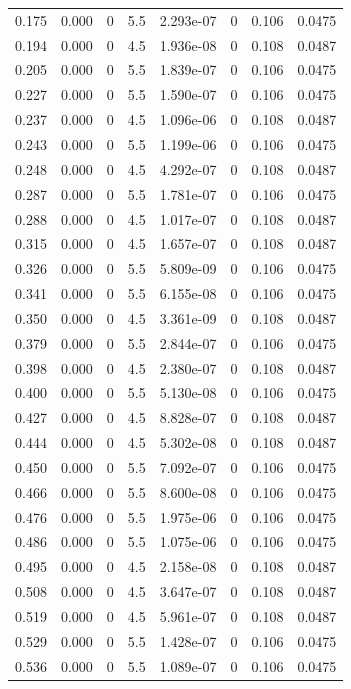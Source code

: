 \documentclass[preview]{standalone}
\begin{document}
{{\begin{tabular}{L{1.2cm}C{1.2cm} C{0.3cm}C{0.5cm} C{1.4cm}C{1.4cm} C{1.4cm}C{1.4cm}}
  0.175  &  0.000  & 0     & 5.5 &  2.293e-07  & 0  & 0.106 &  0.0475   \\ 
  0.194  &  0.000  & 0     & 4.5 &  1.936e-08  & 0  & 0.108 &  0.0487   \\ 
  0.205  &  0.000  & 0     & 5.5 &  1.839e-07  & 0  & 0.106 &  0.0475   \\ 
  0.227  &  0.000  & 0     & 5.5 &  1.590e-07  & 0  & 0.106 &  0.0475   \\ 
  0.237  &  0.000  & 0     & 4.5 &  1.096e-06  & 0  & 0.108 &  0.0487   \\ 
  0.243  &  0.000  & 0     & 5.5 &  1.199e-06  & 0  & 0.106 &  0.0475   \\ 
  0.248  &  0.000  & 0     & 4.5 &  4.292e-07  & 0  & 0.108 &  0.0487   \\ 
  0.287  &  0.000  & 0     & 5.5 &  1.781e-07  & 0  & 0.106 &  0.0475   \\ 
  0.288  &  0.000  & 0     & 4.5 &  1.017e-07  & 0  & 0.108 &  0.0487   \\ 
  0.315  &  0.000  & 0     & 4.5 &  1.657e-07  & 0  & 0.108 &  0.0487   \\ 
  0.326  &  0.000  & 0     & 5.5 &  5.809e-09  & 0  & 0.106 &  0.0475   \\ 
  0.341  &  0.000  & 0     & 5.5 &  6.155e-08  & 0  & 0.106 &  0.0475   \\ 
  0.350  &  0.000  & 0     & 4.5 &  3.361e-09  & 0  & 0.108 &  0.0487   \\ 
  0.379  &  0.000  & 0     & 5.5 &  2.844e-07  & 0  & 0.106 &  0.0475   \\ 
  0.398  &  0.000  & 0     & 4.5 &  2.380e-07  & 0  & 0.108 &  0.0487   \\ 
  0.400  &  0.000  & 0     & 5.5 &  5.130e-08  & 0  & 0.106 &  0.0475   \\ 
  0.427  &  0.000  & 0     & 4.5 &  8.828e-07  & 0  & 0.108 &  0.0487   \\ 
  0.444  &  0.000  & 0     & 4.5 &  5.302e-08  & 0  & 0.108 &  0.0487   \\ 
  0.450  &  0.000  & 0     & 5.5 &  7.092e-07  & 0  & 0.106 &  0.0475   \\ 
  0.466  &  0.000  & 0     & 5.5 &  8.600e-08  & 0  & 0.106 &  0.0475   \\ 
  0.476  &  0.000  & 0     & 5.5 &  1.975e-06  & 0  & 0.106 &  0.0475   \\ 
  0.486  &  0.000  & 0     & 5.5 &  1.075e-06  & 0  & 0.106 &  0.0475   \\ 
  0.495  &  0.000  & 0     & 4.5 &  2.158e-08  & 0  & 0.108 &  0.0487   \\ 
  0.508  &  0.000  & 0     & 4.5 &  3.647e-07  & 0  & 0.108 &  0.0487   \\ 
  0.519  &  0.000  & 0     & 4.5 &  5.961e-07  & 0  & 0.108 &  0.0487   \\ 
  0.529  &  0.000  & 0     & 5.5 &  1.428e-07  & 0  & 0.106 &  0.0475   \\ 
  0.536  &  0.000  & 0     & 5.5 &  1.089e-07  & 0  & 0.106 &  0.0475   \\ 
\hline 
\end{tabular} 

}}
\end{document}
